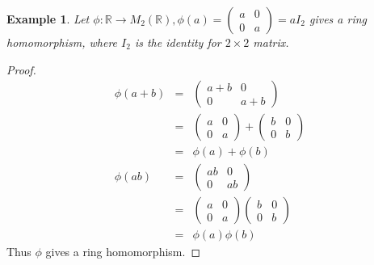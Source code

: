 \documentclass{article}
\theoremstyle{MyNonumberplain}
\theoremstyle{break}
\newtheorem*{proof}{Proof. }
\theoremstyle{break}
\newtheorem{example}{Example}[section]
\theoremstyle{break}
\theoremstyle{definition}
\theoremstyle{break}
\begin{document}
\begin{expbox}
    \begin{example}
        Let $\phi : \mathbb{R} \rightarrow M_2 (\mathbb{R}), \phi (a) =
        \left(\begin{array}{cc}
          a & 0\\
          0 & a
        \end{array}\right) = a I_2$ gives a ring homomorphism, where $I_2$ is the
        identity for $2 \times 2$ matrix.
    \end{example}
    \begin{prfbox}
        \begin{proof}
            \begin{eqnarray*}
                \phi (a + b) & = & \left(\begin{array}{cc}
                  a + b & 0\\
                  0 & a + b
                \end{array}\right)\\
                & = & \left(\begin{array}{cc}
                  a & 0\\
                  0 & a
                \end{array}\right) + \left(\begin{array}{cc}
                  b & 0\\
                  0 & b
                \end{array}\right)\\
                & = & \phi (a) + \phi (b)\\
                \phi (a b) & = & \left(\begin{array}{cc}
                  a b & 0\\
                  0 & a b
                \end{array}\right)\\
                & = & \left(\begin{array}{cc}
                  a & 0\\
                  0 & a
                \end{array}\right) \left(\begin{array}{cc}
                  b & 0\\
                  0 & b
                \end{array}\right)\\
                & = & \phi (a) \phi (b)
              \end{eqnarray*}
              Thus $\phi$ gives a ring homomorphism.
        \end{proof}
    \end{prfbox}
\end{expbox}
\end{document}
